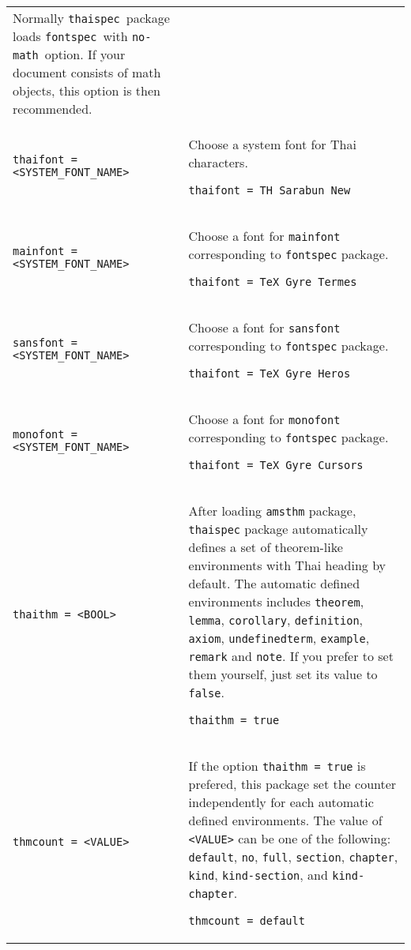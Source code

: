 \documentclass{article}
\newcommand{\pkgname}{\texttt{thaispec}}
\newcommand{\showex}[1]{\par\vspace{0mm}\noindent{Example:}\par\noindent\texttt{#1}}
\begin{document}
\begin{longtable}{l p{5.8cm}}
  Normally \pkgname\ package loads \texttt{fontspec}\ with \texttt{no-math}\ option.
  If your document consists of math objects, this option is then recommended.
  \\
  \texttt{thaifont = <SYSTEM\_FONT\_NAME>}
  & Choose a system font for Thai characters.
  \showex{thaifont = TH Sarabun New}
  \\
  \texttt{mainfont = <SYSTEM\_FONT\_NAME>}
  & Choose a font for \texttt{mainfont} corresponding to \texttt{fontspec} package.
  \showex{thaifont = TeX Gyre Termes}
  \\
  \texttt{sansfont = <SYSTEM\_FONT\_NAME>}
  & Choose a font for \texttt{sansfont} corresponding to \texttt{fontspec} package.
  \showex{thaifont = TeX Gyre Heros}
  \\
  \texttt{monofont = <SYSTEM\_FONT\_NAME>}
  & Choose a font for \texttt{monofont} corresponding to \texttt{fontspec} package.
  \showex{thaifont = TeX Gyre Cursors}
  \\
  \texttt{thaithm = <BOOL>}
  & After loading \texttt{amsthm} package, \texttt{thaispec} package automatically defines
  a set of theorem-like environments with Thai heading by default.
  The automatic defined environments includes
  \texttt{theorem}, \texttt{lemma}, \texttt{corollary},
  \texttt{definition}, \texttt{axiom}, \texttt{undefinedterm},
  \texttt{example}, \texttt{remark} and \texttt{note}.
  If you prefer to set them yourself, just set its value to \texttt{false}.
  \showex{thaithm = true}
  \\
  \texttt{thmcount = <VALUE>}
  & If the option \texttt{thaithm = true} is prefered,
  this package set the counter independently for each automatic defined environments.
  The value of \texttt{<VALUE>} can be one of the following:
  \texttt{default}, \texttt{no}, \texttt{full}, \texttt{section},
  \texttt{chapter}, \texttt{kind}, \texttt{kind-section}, and \texttt{kind-chapter}.
  \showex{thmcount = default}
  \\
\end{longtable}
\end{document}
